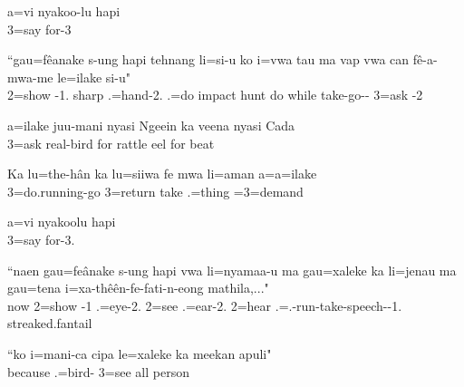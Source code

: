 \ea
\gll a=vi nyakoo-lu hapi\\ 
    3=say for-3 \\ 
    \glt {}
\z

\ea
\gll ``gau=fêanake s-ung hapi tehnang li=si-u ko i=vwa tau ma vap vwa can fê-a-mwa-me le=ilake si-u"\\ 2=show -1.  sharp .=hand-2.  .=do impact  hunt do while take-go-- 3=ask -2\\ \glt {}
\z

\ea
\gll a=ilake juu-mani nyasi Ngeein ka veena nyasi Cada\\ 3=ask real-bird for rattle  eel for beat\\ \glt {}
\z

\ea
\gll Ka lu=the-hân ka lu=siiwa fe mwa li=aman a=a=ilake\\  3=do.running-go  3=return take  .=thing =3=demand\\ \glt {}
\z

\ea
\gll a=vi nyakoolu hapi\\ 
      3=say for-3. \\ 
      \glt {}
\z

\ea
\gll ``naen gau=feânake s-ung hapi vwa li=nyamaa-u ma gau=xaleke ka li=jenau ma gau=tena i=xa-thêên-fe-fati-n-eong mathila,..."\\ now 2=show -1   .=eye-2.  2=see  .=ear-2.  2=hear .=.-run-take-speech--1. streaked.fantail\\ \glt {}
\z

\ea
\gll  ``ko i=mani-ca cipa le=xaleke ka meekan apuli"\\ because .=bird-  3=see  all person\\ \glt {}
\z

